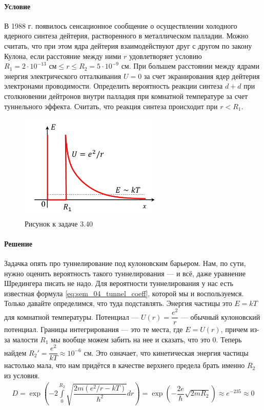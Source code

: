 \documentclass[12pt]{article}
\begin{document}
\paragraph{Условие}
В 1988 г. появилось сенсационное сообщение о осуществлении холодного ядерного синтеза дейтерия, растворенного в металлическом палладии. Можно считать, что при этом ядра дейтерия взаимодействуют друг с другом по закону Кулона, если расстояние между ними $r$ удовлетворяет условию $R_1 = 2\cdot 10^{-13} \text{ см} \le r \le  R_2 = 5\cdot 10^{-9} \text{ см}$. При большем расстоянии между ядрами энергия электрического отталкивания $U=0$ за счет экранирования ядер дейтерия электронами проводимости. Определить вероятность реакции синтеза $d+d$\; при столкновении дейтронов внутри палладия при комнатной температуре за счет туннельного эффекта. Считать, что реакция синтеза происходит при $r<R_1$.
\begin{figure}[h]
    \centering
    \includegraphics[width=0.6\textwidth,height=\textheight,keepaspectratio]{Seminar_04/pics/pic_06.pdf}
    \caption{Рисунок к задаче 3.40}
\end{figure}
\paragraph{Решение}
Задачка опять про туннелирование под кулоновским барьером. Нам, по сути, нужно оценить вероятность такого туннелирования --- и всё, даже уравнение Шредингера писать не надо. Для вероятности туннелирования у нас есть известная формула \ref{eq:sem_04_tunnel_coeff}, которой мы и воспользуемся. Только давайте определимся, что туда подставлять. Энергия частицы это $E = kT$ для комнатной температуры. Потенциал ---
 $U(r) = \dfrac{e^2}{r}$ --- обычный кулоновский потенциал. Границы интегрирования --- это те места, где $E=U(r)$, причем из-за малости $R_1$ мы вообще можем забить на нее и сказать, что это 0. Теперь найдем $R_2' = \dfrac{e^2}{kT} \approx 10^{-6} \text{ см}$. Это означает, что кинетическая энергия частицы настолько мала, что нам придётся в качестве верхнего предела брать именно $R_2$ из условия. 
\begin{gather*}
     D  = \exp{\left( -2\int\limits_{0}^{R_2}\sqrt{\dfrac{2m(e^2/r-kT)}{\hbar^2}} dr \right)} = \exp{\left( -\dfrac{2e}{\hbar}\sqrt{2mR_2} \right)} \approx e^{-235} \approx 0
\end{gather*}
\end{document}
